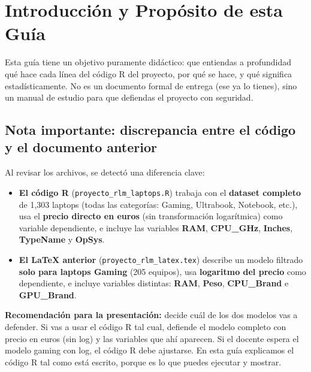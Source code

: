 \documentclass[12pt,a4paper]{article}
\begin{document}
\newpage
\tableofcontents
\newpage

\section{Introducción y Propósito de esta Guía}

Esta guía tiene un objetivo puramente didáctico: que entiendas a profundidad qué hace cada línea del código R del proyecto, por qué se hace, y qué significa estadísticamente. No es un documento formal de entrega (ese ya lo tienes), sino un manual de estudio para que defiendas el proyecto con seguridad.

\subsection{Nota importante: discrepancia entre el código y el documento anterior}

Al revisar los archivos, se detectó una diferencia clave:

\begin{itemize}
    \item \textbf{El código R} (\texttt{proyecto\_rlm\_laptops.R}) trabaja con el \textbf{dataset completo} de 1,303 laptops (todas las categorías: Gaming, Ultrabook, Notebook, etc.), usa el \textbf{precio directo en euros} (sin transformación logarítmica) como variable dependiente, e incluye las variables \textbf{RAM}, \textbf{CPU\_GHz}, \textbf{Inches}, \textbf{TypeName} y \textbf{OpSys}.
    
    \item \textbf{El LaTeX anterior} (\texttt{proyecto\_rlm\_latex.tex}) describe un modelo filtrado \textbf{solo para laptops Gaming} (205 equipos), usa \textbf{logaritmo del precio} como dependiente, e incluye variables distintas: \textbf{RAM}, \textbf{Peso}, \textbf{CPU\_Brand} e \textbf{GPU\_Brand}.
\end{itemize}

\textbf{Recomendación para la presentación:} decide cuál de los dos modelos vas a defender. Si vas a usar el código R tal cual, defiende el modelo completo con precio en euros (sin log) y las variables que ahí aparecen. Si el docente espera el modelo gaming con log, el código R debe ajustarse. En esta guía explicamos el código R tal como está escrito, porque es lo que puedes ejecutar y mostrar.
\end{document}
